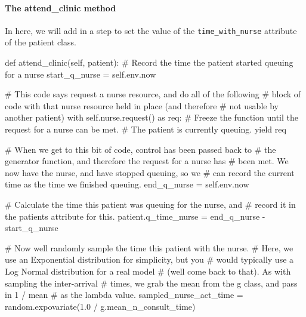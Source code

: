 \documentclass[
  letterpaper,
  DIV=11,
  numbers=noendperiod]{scrreprt}
\let\oldparagraph\paragraph
\renewcommand{\paragraph}[1]{\oldparagraph{#1}\mbox{}}
\newenvironment{Shaded}{}{}
\newcommand{\CommentTok}[1]{\textcolor[rgb]{0.42,0.45,0.49}{#1}}
\newcommand{\ControlFlowTok}[1]{\textcolor[rgb]{0.84,0.23,0.29}{#1}}
\newcommand{\FloatTok}[1]{\textcolor[rgb]{0.00,0.36,0.77}{#1}}
\newcommand{\ImportTok}[1]{\textcolor[rgb]{0.01,0.18,0.38}{#1}}
\newcommand{\KeywordTok}[1]{\textcolor[rgb]{0.84,0.23,0.29}{#1}}
\newcommand{\NormalTok}[1]{\textcolor[rgb]{0.14,0.16,0.18}{#1}}
\newcommand{\OperatorTok}[1]{\textcolor[rgb]{0.14,0.16,0.18}{#1}}
\newcommand{\VariableTok}[1]{\textcolor[rgb]{0.89,0.38,0.04}{#1}}
\begin{document}
\paragraph{The attend\_clinic method}\label{the-attend_clinic-method-5}

In here, we will add in a step to set the value of the
\texttt{time\_with\_nurse} attribute of the patient class.

\begin{Shaded}
\begin{Highlighting}[]
\KeywordTok{def}\NormalTok{ attend\_clinic(}\VariableTok{self}\NormalTok{, patient):}
    \CommentTok{\# Record the time the patient started queuing for a nurse}
\NormalTok{    start\_q\_nurse }\OperatorTok{=} \VariableTok{self}\NormalTok{.env.now}

    \CommentTok{\# This code says request a nurse resource, and do all of the following}
    \CommentTok{\# block of code with that nurse resource held in place (and therefore}
    \CommentTok{\# not usable by another patient)}
    \ControlFlowTok{with} \VariableTok{self}\NormalTok{.nurse.request() }\ImportTok{as}\NormalTok{ req:}
        \CommentTok{\# Freeze the function until the request for a nurse can be met.}
        \CommentTok{\# The patient is currently queuing.}
        \ControlFlowTok{yield}\NormalTok{ req}

        \CommentTok{\# When we get to this bit of code, control has been passed back to}
        \CommentTok{\# the generator function, and therefore the request for a nurse has}
        \CommentTok{\# been met.  We now have the nurse, and have stopped queuing, so we}
        \CommentTok{\# can record the current time as the time we finished queuing.}
\NormalTok{        end\_q\_nurse }\OperatorTok{=} \VariableTok{self}\NormalTok{.env.now}

        \CommentTok{\# Calculate the time this patient was queuing for the nurse, and}
        \CommentTok{\# record it in the patient\textquotesingle{}s attribute for this.}
\NormalTok{        patient.q\_time\_nurse }\OperatorTok{=}\NormalTok{ end\_q\_nurse }\OperatorTok{{-}}\NormalTok{ start\_q\_nurse}

        \CommentTok{\# Now we\textquotesingle{}ll randomly sample the time this patient with the nurse.}
        \CommentTok{\# Here, we use an Exponential distribution for simplicity, but you}
        \CommentTok{\# would typically use a Log Normal distribution for a real model}
        \CommentTok{\# (we\textquotesingle{}ll come back to that).  As with sampling the inter{-}arrival}
        \CommentTok{\# times, we grab the mean from the g class, and pass in 1 / mean}
        \CommentTok{\# as the lambda value.}
\NormalTok{        sampled\_nurse\_act\_time }\OperatorTok{=}\NormalTok{ random.expovariate(}\FloatTok{1.0} \OperatorTok{/}
\NormalTok{                                                    g.mean\_n\_consult\_time)}


\end{Highlighting}
\end{Shaded}
\end{document}
